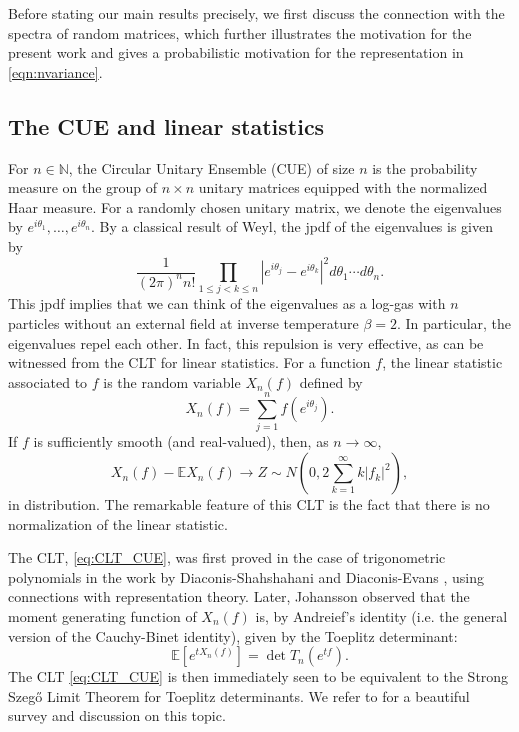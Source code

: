 \documentclass[11pt]{amsart}
\theoremstyle{plain}
\theoremstyle{remark}
\numberwithin{equation}{section}
\begin{document}
Before stating our main results precisely, we first discuss the connection with
the spectra of random matrices, which further illustrates the motivation for
the present work and gives a probabilistic motivation for the representation in \eqref{eqn:nvariance}.

\subsection{The CUE and linear statistics}

For $n \in \mathbb N$, the Circular Unitary Ensemble (CUE) of size $n$ is the probability measure on the group of $n\times n$ unitary matrices equipped with the normalized Haar measure. 
For a randomly chosen unitary matrix, we denote the eigenvalues by $e^{i \theta_1},\ldots,e^{i \theta_n}$. By a classical result of Weyl, the jpdf of the eigenvalues is given by 
\begin{equation}\label{eq:jpdf_eigenvalues_CUE}
    \frac{1}{(2 \pi)^n n! } \prod_{1\leq j< k \leq n }|e^{i \theta_j}-e^{i \theta_k}|^2 d \theta_1 \cdots d \theta_n.
\end{equation}
This jpdf implies that we can think of the eigenvalues as a log-gas with $n$ particles without an external field at inverse temperature $\beta=2$. 
In particular, the eigenvalues repel each other. In fact, this repulsion is very effective, as can be witnessed from the CLT for linear statistics. 
For a function $f$, the linear statistic associated to $f$ is the random variable $X_n(f)$ defined by 
\begin{equation}\label{eq:CLT_linear_statistic}
    X_n(f)=\sum_{j=1}^n f(e^{i \theta_j}).
\end{equation}
If $f$ is sufficiently smooth (and real-valued), then, as $n \to \infty$,
\begin{equation} \label{eq:CLT_CUE}
    X_n(f)-\mathbb E X_n(f) \to Z \sim N\left(0,2 \sum_{k=1}^\infty k |f_k|^2\right),
\end{equation}
in distribution.
The remarkable feature of this CLT is the fact that there is no normalization of the linear statistic. 

The CLT, \eqref{eq:CLT_CUE}, was first proved in the case of trigonometric polynomials in the work by Diaconis-Shahshahani \cite{DiaconisShah} and Diaconis-Evans  \cite{DiaconisEvans}, using connections with representation theory. 
Later, Johansson \cite{Joh1} observed that the moment generating function of $X_n(f)$ is, by Andreief's identity (i.e. the general version of the Cauchy-Binet identity), given by the Toeplitz determinant:
\begin{equation}\label{eq:linear_statistic_toeplitz_determinant}
    \mathbb E[e^{t X_n(f)}]=\det T_n(e^{tf}).
\end{equation}
The CLT \eqref{eq:CLT_CUE} is then immediately seen to be equivalent to the Strong Szeg\H{o} Limit Theorem  for Toeplitz determinants. We refer to \cite{Diaconis} for a beautiful survey and discussion on this topic. 
\end{document}
